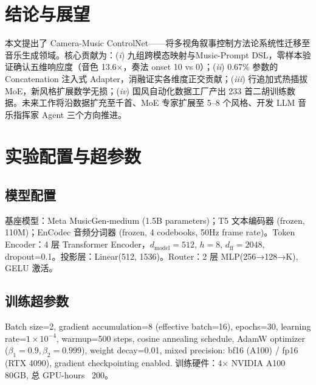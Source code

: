 \documentclass[11pt,twocolumn]{article}
\begin{document}
\section{结论与展望}

本文提出了 Camera-Music ControlNet——将多视角叙事控制方法论系统性迁移至音乐生成领域。核心贡献为：(\textit{i}) 九组跨模态映射与Music-Prompt DSL，零样本验证确认五维响应度（音色 13.6$\times$，奏法 onset 10 vs 0）；(\textit{ii}) 0.67\% 参数的 Concatenation 注入式 Adapter，消融证实各维度正交贡献；(\textit{iii}) 行追加式热插拔 MoE，新风格扩展数学无损；(\textit{iv}) 国风自动化数据工厂产出 233 首二胡训练数据。未来工作将沿数据扩充至千首、MoE 专家扩展至 5--8 个风格、开发 LLM 音乐指挥家 Agent 三个方向推进。


\newpage
\appendix
\section{实验配置与超参数}

\subsection{模型配置}
基座模型：Meta MusicGen-medium (1.5B parameters)；T5 文本编码器 (frozen, 110M)；EnCodec 音频分词器 (frozen, 4 codebooks, 50Hz frame rate)。Token Encoder：4 层 Transformer Encoder，$d_{\text{model}}=512$, $h=8$, $d_{\text{ff}}=2048$, dropout=0.1。投影层：Linear(512, 1536)。Router：2 层 MLP(256→128→K), GELU 激活。

\subsection{训练超参数}
Batch size=2, gradient accumulation=8 (effective batch=16), epochs=30, learning rate=$1\times10^{-4}$, warmup=500 steps, cosine annealing schedule, AdamW optimizer ($\beta_1=0.9,\beta_2=0.999$), weight decay=0.01, mixed precision: bf16 (A100) / fp16 (RTX 4090), gradient checkpointing enabled. 训练硬件：4× NVIDIA A100 80GB, 总 GPU-hours ~200。
\end{document}
